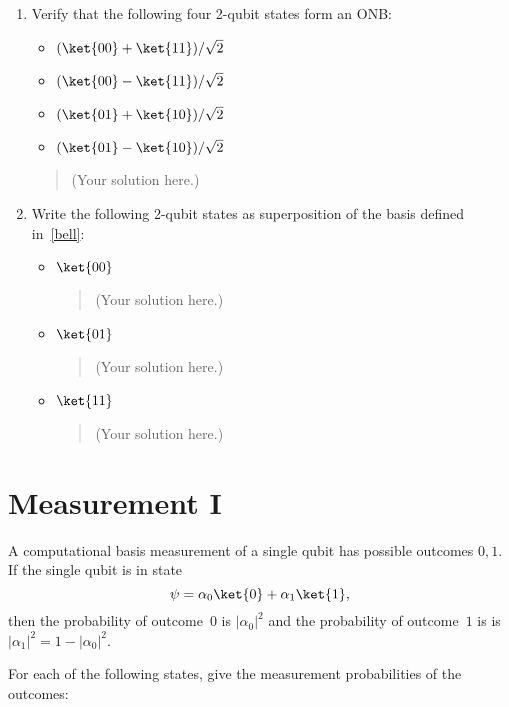 \documentclass[a4paper,10pt,reqno,nonamelimits]{article}
\begin{document}
\begin{enumerate}[label=(\alph*)]
\item\label{bell} Verify that the following four 2-qubit states form an ONB:
  \begin{itemize}
  \item $( \ket{00}+\ket{11} )/\sqrt2$
  \item $( \ket{00}-\ket{11} )/\sqrt2$
  \item $( \ket{01}+\ket{10} )/\sqrt2$
  \item $( \ket{01}-\ket{10} )/\sqrt2$
  \end{itemize}

    \begin{quotation}\color{blue}
      (Your solution here.)
    \end{quotation}

\item Write the following 2-qubit states as superposition of the basis defined in~\ref{bell}:
  \begin{itemize}
  \item $\ket{00}$
    \begin{quotation}\color{blue}
      (Your solution here.)
    \end{quotation}
  \item $\ket{01}$
    \begin{quotation}\color{blue}
      (Your solution here.)
    \end{quotation}
  \item $\ket{11}$
    \begin{quotation}\color{blue}
      (Your solution here.)
    \end{quotation}
  \end{itemize}
\end{enumerate}

\section{Measurement I}

A computational basis measurement of a single qubit has possible outcomes $0,1$.  If the single qubit is in state
\begin{equation*}
  \psi = \alpha_0\ket{0} + \alpha_1 \ket{1},
\end{equation*}
then the probability of outcome~$0$ is $|\alpha_0|^2$ and the probability of outcome~$1$ is is
$|\alpha_1|^2 = 1 - |\alpha_0|^2$.

For each of the following states, give the measurement probabilities of the outcomes:
\end{document}
